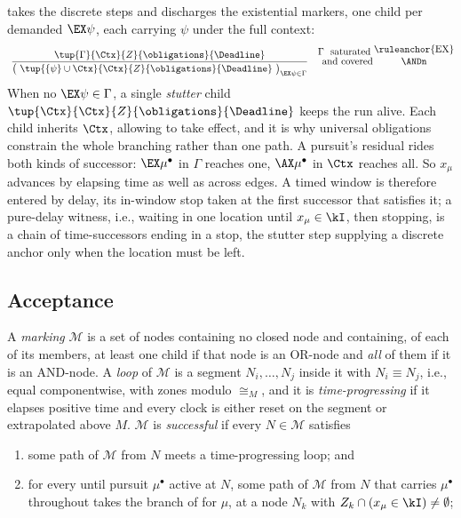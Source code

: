  takes the discrete steps and discharges the existential markers, one child per demanded
$\EX\psi$, each carrying $\psi$ under the full context:
\[
\ \frac{\tup{\Gamma}{\Ctx}{Z}{\obligations}{\Deadline}}
{\big(\ \tup{\{\psi\}\cup\Ctx}{\Ctx}{Z}{\obligations}{\Deadline}\ \big)_{\EX\psi\in\Gamma}}
\quad  \shortstack{$\Gamma$ \text{ saturated }\\ \text { and covered}}
\shortstack{\ruleanchor{EX}\\ \ANDn }
\]
When no $\EX\psi\in\Gamma$, a single \emph{stutter} child
$\tup{\Ctx}{\Ctx}{Z}{\obligations}{\Deadline}$ keeps the run alive. Each child inherits $\Ctx$, allowing  to take effect, and it is why universal obligations constrain the whole
branching rather than one path. A pursuit's residual rides both kinds of successor: $\EX\mu^\bullet$ in $\Gamma$ reaches one, $\AX\mu^\bullet$ in $\Ctx$ reaches all. So $x_\mu$ advances by elapsing time as well as across edges.
A timed window is therefore entered by delay, its in-window stop taken at the first successor that
satisfies it; a pure-delay witness, i.e., waiting in one location until $x_\mu\in\kI$, then stopping, is a
chain of time-successors ending in a stop, the stutter step supplying a discrete anchor only when the
location must be left.

\subsection{Acceptance}\label{ss:loop}

A \emph{marking} $\mathcal M$ is a set of nodes containing no closed node and containing, of each of
its members, at least one child if that node is an OR-node and \emph{all} of them if it is an
AND-node. A \emph{loop} of $\mathcal M$ is a segment $N_i,\dots,N_j$ inside it with
$N_i\equiv N_j$, i.e., equal componentwise, with zones modulo $\cong_M$, and it is
\emph{time-progressing} if it elapses positive time and every clock is either reset on the segment
or extrapolated above $M$. $\mathcal M$ is \emph{successful} if every $N\in\mathcal M$ satisfies

\begin{enumerate}[start=1,label={M\arabic*)}, itemindent=2em, ref=(M\arabic*), itemsep=0.1em]
\item \label{M1} some path of $\mathcal M$ from $N$ meets a time-progressing loop; and
\item \label{M2} for every until pursuit $\mu^\bullet$ active at $N$, some path of $\mathcal M$ from
    $N$ that carries $\mu^\bullet$ throughout takes the  branch of  for
    $\mu$, at a node $N_k$ with $Z_k\cap(x_\mu\in\kI)\neq\emptyset$;
\end{enumerate}

